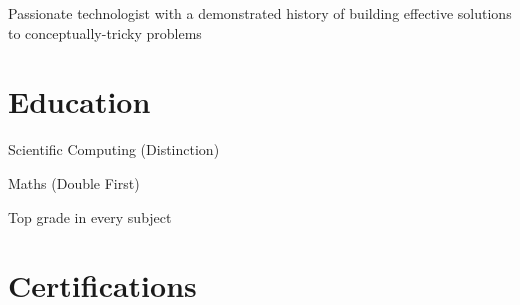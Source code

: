 \documentclass[a4paper]{custom-resume}
\begin{document}

\lastupdated



\vfill

\center
Passionate technologist with a demonstrated history of building effective solutions to conceptually-tricky problems

\vfill


\begin{minipage}[t][0.8\textheight]{0.33\textwidth}


\section{Education}

 \vspace{2pt}
Scientific Computing (Distinction)

\sectionspace

 \vspace{2pt}
Maths (Double First) \\ \vspace{2pt}

\sectionspace

 \vspace{2pt}
Top grade in every subject\\ \vspace{2pt}

\vfill


\section{Certifications}


\sectionspace



\end{minipage}
\end{document}
